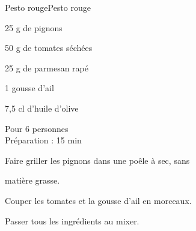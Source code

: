 \begin{recette}{Pesto rouge}{Pesto rouge}

\begin{ingredients}
25 g de pignons\par
50 g de tomates séchées\par
25 g de parmesan rapé\par
1 gousse d’ail\par
7,5 cl d’huile d’olive\par
\end{ingredients}

\begin{infos}
Pour 6 personnes\\
Préparation : 15 min\\
\end{infos}

\begin{etapes}
\item Faire griller les pignons dans une poêle à sec, sans
\item matière grasse.
\item Couper les tomates et la gousse d’ail en morceaux.
\item Passer tous les ingrédients au mixer.
\end{etapes}

\end{recette}